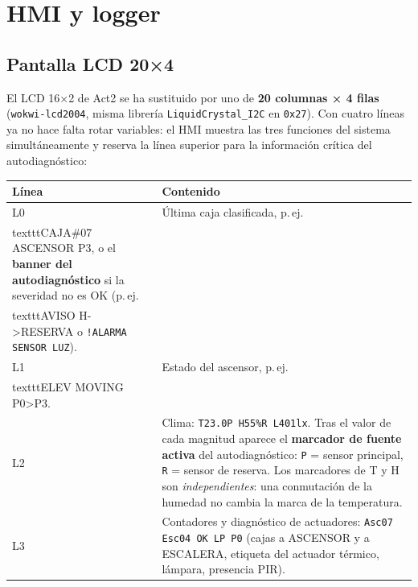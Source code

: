 \section{HMI y logger}
\label{sec:hmi}

\subsection{Pantalla LCD 20×4}

El LCD 16×2 de Act2 se ha sustituido por uno de
\textbf{20 columnas × 4 filas} (\texttt{wokwi-lcd2004}, misma
librería \texttt{LiquidCrystal\_I2C} en \texttt{0x27}). Con cuatro líneas
ya no hace falta rotar variables: el HMI muestra las tres funciones del
sistema simultáneamente y reserva la línea superior para la información
crítica del autodiagnóstico:

\begin{center}\small
\begin{tabular}{@{}l@{\hspace{1.5em}}p{}@{}}
\toprule
\textbf{Línea} & \textbf{Contenido} \\
\midrule
L0 & Última caja clasificada, p.\,ej.\\texttt{CAJA\#07 ASCENSOR P3}, o el
      \textbf{banner del autodiagnóstico} si la severidad no es \textsf{OK}
      (p.\,ej.\\texttt{AVISO H->RESERVA} o \texttt{!ALARMA SENSOR LUZ}). \\
L1 & Estado del ascensor, p.\,ej.\\texttt{ELEV MOVING P0>P3}. \\
L2 & Clima: \texttt{T23.0P H55\%R L401lx}. Tras el valor de cada magnitud
      aparece el \textbf{marcador de fuente activa} del autodiagnóstico:
      \texttt{P} = sensor principal, \texttt{R} = sensor de reserva. Los
      marcadores de T y H son \emph{independientes}: una conmutación de la
      humedad no cambia la marca de la temperatura. \\
L3 & Contadores y diagnóstico de actuadores:
      \texttt{Asc07 Esc04 OK LP P0} (cajas a ASCENSOR y a ESCALERA,
      etiqueta del actuador térmico, lámpara, presencia PIR). \\
\bottomrule
\end{tabular}
\end{center}

